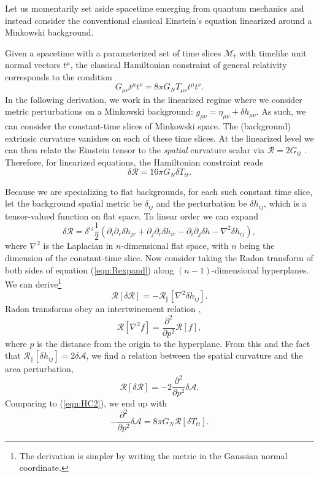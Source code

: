\documentclass[%
preprint,
nofootinbib,
amsmath,amssymb,
aps,
prd,
showpacs,
superscriptaddress
]{revtex4-1}
\newcommand{\R}{\mathscr{R}}
\newcommand{\area}{\mathcal{A}}
\begin{document}
Let us momentarily set aside spacetime emerging from quantum mechanics and instead consider the conventional classical Einstein's equation linearized around a Minkowski background. 

Given a spacetime with a parameterized set of time slices $\mathcal{M}_t$ with timelike unit normal vectors $t^\mu$, the classical Hamiltonian constraint of general relativity corresponds to the condition
\begin{equation}
G_{\mu\nu}t^{\mu}t^{\nu}= 8\pi G_N T_{\mu\nu}t^{\mu}t^{\nu}.
\end{equation}
In the following derivation, we work in the linearized regime where we consider metric perturbations on a Minkowski background: $g_{\mu\nu} = \eta_{\mu\nu}+\delta h_{\mu\nu}$. As such, we can consider the constant-time slices of Minkowski space.
The (background) extrinsic curvature vanishes on each of these time slices. 
At the linearized level we can then relate the Einstein tensor to the \emph{spatial} curvature scalar via  $\mathcal{R} = 2G_{tt}$ \cite{Gourgoulhon:2007ue}.
Therefore, for linearized equations, the Hamiltonian constraint reads
\begin{equation}
 \delta \mathcal{R} = 16\pi G_N \delta T_{tt}.
\label{eqn:HC2}
\end{equation}

Because we are specializing to flat backgrounds, for each such constant time slice, let the background spatial metric be $\delta_{ij}$ and the perturbation be $\delta h_{ij}$, which is a tensor-valued function on flat space. 
To linear order we can expand 
\begin{equation}
 \delta \mathcal{R}=\delta^{ij}\frac 1 2 (\partial_i\partial_r \delta h_{jr}+\partial_j\partial_r \delta h_{ir}-\partial_i\partial_j\delta h-\nabla^2 \delta h_{ij}),
 \label{eqn:Rexpand}
\end{equation}
where $\nabla^2$ is the Laplacian in $n$-dimensional flat space, with $n$ being the dimension of the constant-time slice. 
Now consider taking the Radon transform of both sides of equation (\ref{eqn:Rexpand}) along $(n-1)$-dimensional hyperplanes. We can derive\footnote{The derivation is simpler by writing the metric in the Gaussian normal coordinate.}
\begin{equation}
 \R[\delta \mathcal{R}]=- \R_{\parallel}[\nabla^2 \delta h_{ij}].
\end{equation}
Radon transforms obey an intertwinement relation \cite{helgason1999Radon},
\begin{equation}
  \R[\nabla^2 f] = \frac{\partial^2}{\partial p^2} \R[f],
\end{equation}
where $p$ is the distance from the origin to the hyperplane.
From this and the fact that $\R_{\parallel}[\delta h_{ij}]=2\delta \area$, we find a relation between the spatial curvature and the area perturbation,
\begin{equation}
 \R[\delta \mathcal{R}] =- 2\frac{\partial^2}{\partial p^2}\delta \area.
\end{equation}
Comparing to (\ref{eqn:HC2}), we end up with
\begin{equation}
-\frac{\partial^2}{\partial p^2}\delta \area = 8\pi G_N \R[\delta T_{tt}].
\label{eqn:Radonricci}
\end{equation}
\end{document}

